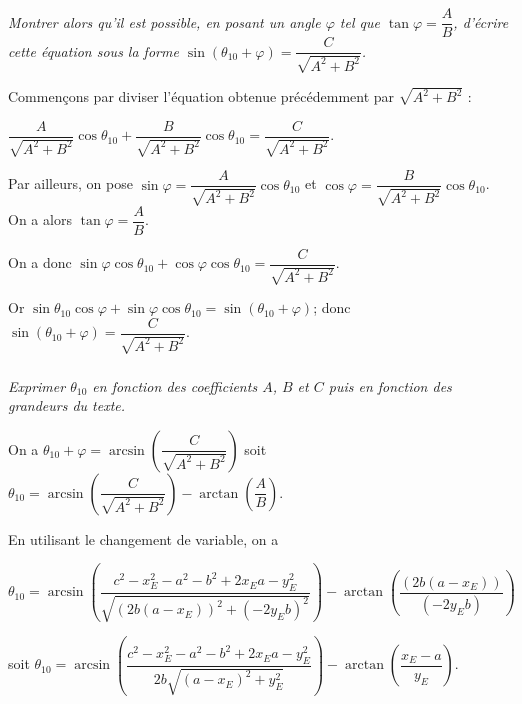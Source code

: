 \documentclass[10pt,fleqn]{article} %
\begin{document}
\fi


\subparagraph{\label{q_04}}\textit{Montrer alors qu’il est possible, en posant un angle $\varphi$  tel que 
$\tan \varphi = \dfrac{A}{B}$, d’écrire cette équation sous la forme $\sin\left(\theta_{10}+\varphi \right)=\dfrac{C}{\sqrt{A^2 + B^2}}$.}
\ifprof
\begin{corrige}
Commençons par diviser l'équation obtenue précédemment par $\sqrt{A^2 + B^2}$ : 

 $\dfrac{A}{\sqrt{A^2 + B^2}}\cos\theta_{10}+ \dfrac{B}{\sqrt{A^2 + B^2}}\cos\theta_{10} = \dfrac{C}{\sqrt{A^2 + B^2}}$. 
 
 Par ailleurs, on pose   $\sin\varphi = \dfrac{A}{\sqrt{A^2 + B^2}}\cos\theta_{10}$ et 
 $\cos\varphi = \dfrac{B}{\sqrt{A^2 + B^2}}\cos\theta_{10}$. On a alors $\tan \varphi = \dfrac{A}{B}$.
 
 On a donc    $\sin\varphi \cos\theta_{10}+ \cos\varphi \cos\theta_{10} = \dfrac{C}{\sqrt{A^2 + B^2}}$. 

Or $ \sin\theta_{10} \cos\varphi + \sin\varphi  \cos\theta_{10}=\sin\left(\theta_{10}+\varphi \right)  $; donc
  $\sin\left(\theta_{10}+\varphi \right) =  \dfrac{C}{\sqrt{A^2 + B^2}}$.
 

\end{corrige}
\else
\fi

\subparagraph{\label{q_05}}\textit{Exprimer $\theta_{10}$ en fonction des coefficients $A$, $B$ et $C$ puis en fonction des grandeurs du texte.}
\ifprof
\begin{corrige}

On a $\theta_{10}+\varphi  = \arcsin\left( \dfrac{C}{\sqrt{A^2 + B^2}}\right)$
soit $\theta_{10}  = \arcsin\left( \dfrac{C}{\sqrt{A^2 + B^2}}\right)  - \arctan\left(\dfrac{A}{B}\right)$.

En utilisant le changement de variable, on a 

$\theta_{10}  = \arcsin\left( \dfrac{ c^2 - x_E^2 - a^2-b^2 +2x_Ea - y_E^2}{\sqrt{\left( 2b\left(a- x_E\right)\right)^2 + \left( -2y_E   b  \right)^2}}\right)  - \arctan\left(\dfrac{\left( 2b\left(a- x_E\right)\right)}{\left( -2y_E   b  \right)}\right)$

soit 
$\theta_{10}  = \arcsin\left( \dfrac{ c^2 - x_E^2 - a^2-b^2 +2x_Ea - y_E^2}{2b\sqrt{\left( a- x_E\right)^2 +  y_E   ^2}}\right)  - \arctan\left(\dfrac{  x_E-a}{ y_E  }\right)$.

\end{corrige}
\else
\fi
\end{document}
